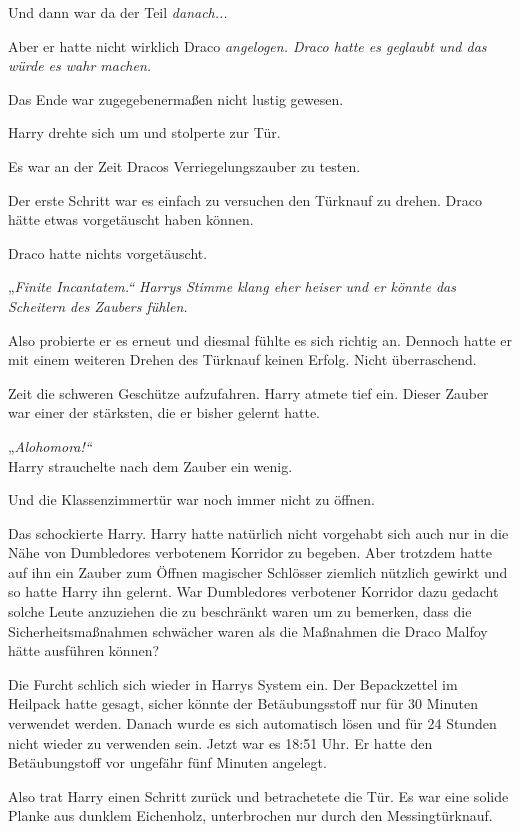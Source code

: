 {Und dann war da der Teil \emph{danach...}

Aber er hatte nicht wirklich Draco \emph{angelogen. Draco hatte es geglaubt und \emph{das würde es wahr machen.}}

Das Ende war zugegebenermaßen nicht lustig gewesen.

Harry drehte sich um und stolperte zur Tür.

Es war an der Zeit Dracos Verriegelungszauber zu testen.

Der erste Schritt war es einfach zu versuchen den Türknauf zu drehen. Draco hätte etwas vorgetäuscht haben können.

Draco hatte nichts vorgetäuscht.

„\emph{Finite Incantatem.“ Harrys Stimme klang eher heiser und er könnte das Scheitern des Zaubers fühlen.}

Also probierte er es erneut und diesmal fühlte es sich richtig an. Dennoch hatte er mit einem weiteren Drehen des Türknauf keinen Erfolg. Nicht überraschend.

Zeit die schweren Geschütze aufzufahren. Harry atmete tief ein. Dieser Zauber war einer der stärksten, die er bisher gelernt hatte.

„\emph{Alohomora!“}\\ Harry strauchelte nach dem Zauber ein wenig.

Und die Klassenzimmertür war noch immer nicht zu öffnen.

Das schockierte Harry. Harry hatte natürlich nicht vorgehabt sich auch nur in die Nähe von Dumbledores verbotenem Korridor zu begeben. Aber trotzdem hatte auf ihn ein Zauber zum Öffnen magischer Schlösser ziemlich nützlich gewirkt und so hatte Harry ihn gelernt. War Dumbledores verbotener Korridor dazu gedacht solche Leute anzuziehen die zu beschränkt waren um zu bemerken, dass die Sicherheitsmaßnahmen schwächer waren als die Maßnahmen die Draco Malfoy hätte ausführen können?

Die Furcht schlich sich wieder in Harrys System ein. Der Bepackzettel im Heilpack hatte gesagt, sicher könnte der Betäubungsstoff nur für 30 Minuten verwendet werden. Danach wurde es sich automatisch lösen und für 24 Stunden nicht wieder zu verwenden sein. Jetzt war es 18:51 Uhr. Er hatte den Betäubungstoff vor ungefähr fünf Minuten angelegt.

Also trat Harry einen Schritt zurück und betrachetete die Tür. Es war eine solide Planke aus dunklem Eichenholz, unterbrochen nur durch den Messingtürknauf.

}
